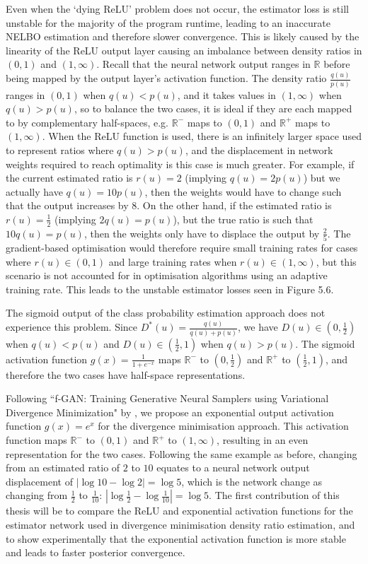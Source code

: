 \documentclass[honours,12pt]{unswthesis}
\newcommand{\R}{\mathbb{R}}
\numberwithin{equation}{section}
\theoremstyle{definition}
\begin{document}
Even when the `dying ReLU' problem does not occur, the estimator loss is still unstable for the majority of the program runtime, leading to an inaccurate NELBO estimation and therefore slower convergence. This is likely caused by the linearity of the ReLU output layer causing an imbalance between density ratios in $(0,1)$ and $(1,\infty)$. Recall that the neural network output ranges in $\R$ before being mapped by the output layer's activation function. The density ratio $\frac{q(u)}{p(u)}$ ranges in $(0,1)$ when $q(u)<p(u)$, and it takes values in $(1,\infty)$ when $q(u)>p(u)$, so to balance the two cases, it is ideal if they are each mapped to by complementary half-spaces, e.g. $\R^-$ maps to $(0,1)$ and $\R^+$ maps to $(1,\infty)$. When the ReLU function is used, there is an infinitely larger space used to represent ratios where $q(u)>p(u)$, and the displacement in network weights required to reach optimality is this case is much greater. For example, if the current estimated ratio is $r(u)=2$ (implying $q(u)=2p(u)$) but we actually have $q(u)=10p(u)$, then the weights would have to change such that the output increases by $8$. On the other hand, if the estimated ratio is $r(u)=\frac12$ (implying $2q(u)=p(u)$), but the true ratio is such that $10q(u)=p(u)$, then the weights only have to displace the output by $\frac25$. The gradient-based optimisation would therefore require small training rates for cases where $r(u)\in (0,1)$ and large training rates when $r(u)\in(1,\infty)$, but this scenario is not accounted for in optimisation algorithms using an adaptive training rate. This leads to the unstable estimator losses seen in Figure 5.6.

The sigmoid output of the class probability estimation approach does not experience this problem. Since $D^*(u)=\frac{q(u)}{q(u)+p(u)}$, we have $D(u)\in(0,\frac12)$ when $q(u)<p(u)$ and $D(u)\in(\frac12,1)$ when $q(u)>p(u)$. The sigmoid activation function $g(x)=\frac{1}{1+e^{-x}}$ maps $\R^-$ to $(0,\frac12)$ and $\R^+$ to $(\frac12,1)$, and therefore the two cases have half-space representations.

Following ``f-GAN: Training Generative Neural Samplers using Variational Divergence Minimization" by \citet{nowozin}, we propose an exponential output activation function $g(x)=e^x$ for the divergence minimisation approach. This activation function maps $\R^-$ to $(0,1)$ and $\R^+$ to $(1,\infty)$, resulting in an even representation for the two cases. Following the same example as before, changing from an estimated ratio of $2$ to $10$ equates to a neural network output displacement of $|\log 10-\log 2|=\log 5$, which is the network change as changing from $\frac12$ to $\frac{1}{10}$: $|\log \frac12-\log\frac{1}{10}|=\log 5$. The first contribution of this thesis will be to compare the ReLU and exponential activation functions for the estimator network used in divergence minimisation density ratio estimation, and to show experimentally that the exponential activation function is more stable and leads to faster posterior convergence.
\end{document}
